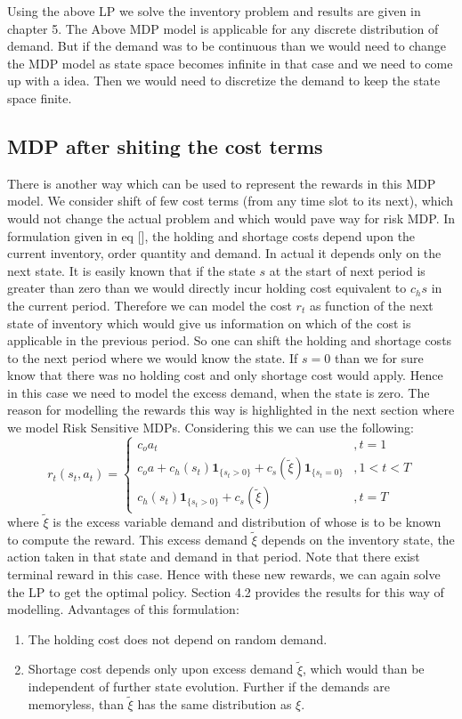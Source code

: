 \documentclass[11pt,a4paper,oneside]{report}
\begin{document}
Using the above LP we solve the inventory problem and results are given in chapter 5. The Above MDP model is  applicable for any discrete distribution of demand. But if the demand was to be continuous than we would need to change the MDP model as state space becomes infinite in that case and we need to come up with a idea. Then we would need to discretize the demand to keep the state space finite. 
\subsection{MDP after shiting the cost terms}
There is another way which can be used to represent the rewards in this MDP model. We consider  shift of few cost terms (from any time slot to its next), which would not change the actual problem and which would pave way for risk MDP. In formulation given in eq [], the holding and shortage costs depend upon the current inventory, order quantity and demand. In actual it depends only on the next state. It is easily known that if the state $s$ at the start of next period is greater than zero than we would directly incur holding cost equivalent to $c_hs$ in the current period. Therefore we can model the cost $r_t$ as function of the next state of inventory which would give us information on which of the cost is applicable in the previous period. So one can shift the holding and shortage costs to the next period where we would know the state. If $s=0$ than we for sure know that there was no holding cost and only shortage cost would apply.
Hence in this case we need to model the excess demand, when the state is zero. The reason for modelling the rewards this way is highlighted in the next section where we model Risk Sensitive MDPs. Considering this we can use the following:\\
\begin{equation*}
r_t(s_t,a_t)=
\begin{cases}
c_{o}a_t&,t=1\\
c_{o}a + c_h(s_t)\mathbf{1}_{\lbrace s_t>0\rbrace} + c_s(\tilde{\xi})\mathbf{1}_{\lbrace s_t=0\rbrace}&,1<t< T\\
c_h(s_t)\mathbf{1}_{\lbrace s_t>0\rbrace} + c_s(\tilde{\xi})&,t=T
\end{cases}
\end{equation*}
\noindent where $\tilde{\xi}$ is the excess variable demand and distribution of whose is to be known to compute the reward. This excess demand $\tilde{\xi}$ depends on the inventory state, the action taken in that state and demand in that period. Note that there exist terminal reward in this case. Hence with these new rewards, we can again solve the LP to get the optimal policy. Section 4.2 provides the results for this way of modelling. 
Advantages of this formulation:
\begin{enumerate}
\item The holding cost does not depend on random demand.
\item Shortage cost depends only upon excess demand $\tilde\xi$, which would than be independent of further state evolution. Further if the demands are memoryless, than $\tilde{\xi}$ has the same distribution as $\xi$.
\end{enumerate}
\end{document}
